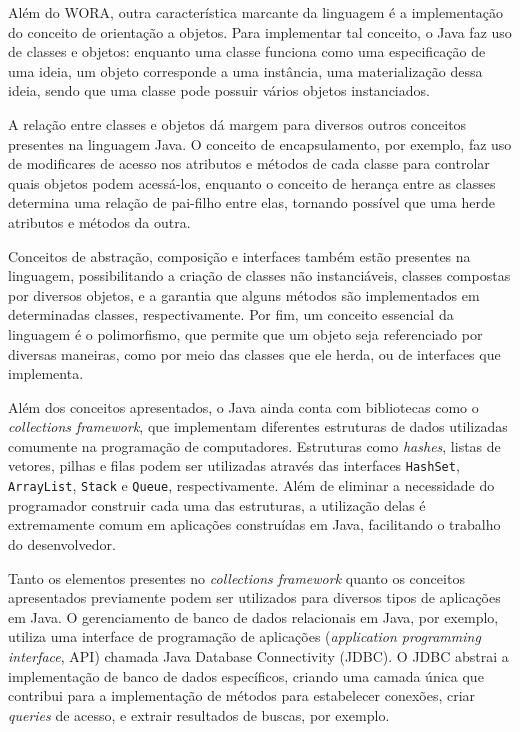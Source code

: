 Além do WORA, outra característica marcante da linguagem é a implementação do conceito de orientação a objetos. Para implementar tal conceito, o Java faz uso de classes e objetos: enquanto uma classe funciona como uma especificação de uma ideia, um objeto corresponde a uma instância, uma materialização dessa ideia, sendo que uma classe pode possuir vários objetos instanciados.

A relação entre classes e objetos dá margem para diversos outros conceitos presentes na linguagem Java. O conceito de encapsulamento, por exemplo, faz uso de modificares de acesso nos atributos e métodos de cada classe para controlar quais objetos podem acessá-los, enquanto o conceito de herança entre as classes determina uma relação de pai-filho entre elas, tornando possível que uma herde atributos e métodos da outra.

Conceitos de abstração, composição e interfaces também estão presentes na linguagem, possibilitando a criação de classes não instanciáveis, classes compostas por diversos objetos, e a garantia que alguns métodos são implementados em determinadas classes, respectivamente. Por fim, um conceito essencial da linguagem é o polimorfismo, que permite que um objeto seja referenciado por diversas maneiras, como por meio das classes que ele herda, ou de interfaces que implementa.

Além dos conceitos apresentados, o Java ainda conta com bibliotecas como o \textit{collections framework}, que implementam diferentes estruturas de dados utilizadas comumente na programação de computadores. Estruturas como \textit{hashes}, listas de vetores, pilhas e filas podem ser utilizadas através das interfaces \verb|HashSet|, \verb|ArrayList|, \verb|Stack| e \verb|Queue|, respectivamente. Além de eliminar a necessidade do programador construir cada uma das estruturas, a utilização delas é extremamente comum em aplicações construídas em Java, facilitando o trabalho do desenvolvedor.

Tanto os elementos presentes no \textit{collections framework} quanto os conceitos apresentados previamente podem ser utilizados para diversos tipos de aplicações em Java. O gerenciamento de banco de dados relacionais em Java, por exemplo, utiliza uma interface de programação de aplicações (\textit{application programming interface}, API) chamada Java Database Connectivity (JDBC). O JDBC abstrai a implementação de banco de dados específicos, criando uma camada única que contribui para a implementação de métodos para estabelecer conexões, criar \textit{queries} de acesso, e extrair resultados de buscas, por exemplo.

